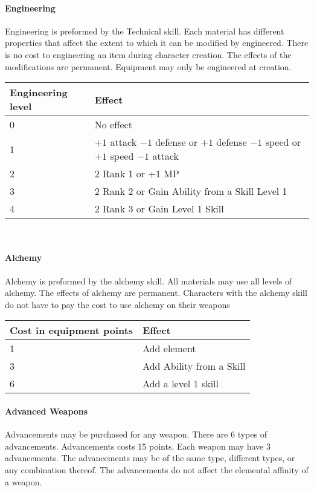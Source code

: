 \paragraph{Engineering}

Engineering is preformed by the Technical skill.  Each material has different
properties that affect the extent to which it can be modified by engineered.
There is no cost to engineering an item during character creation.  The effects
of the modifications are permanent.  Equipment may only be engineered at
creation. \\
\begin{center}
\begin{tabularx}{\textwidth}{X X}
\hline
Engineering level & Effect \\

\hline0 & No effect \\
1 & $+1$ attack $-1$ defense or $+1$ defense $-1$ speed or $+1$ speed $-1$ attack \\
2 & 2 Rank 1 or +1 MP \\
3 & 2 Rank 2 or Gain Ability from a Skill Level 1\\
4 & 2 Rank 3 or Gain Level 1 Skill \\
\hline
\end{tabularx}\\
\end{center}

\paragraph{Alchemy}
Alchemy is preformed by the alchemy skill.  All materials may use all levels of
alchemy.  The effects of alchemy are permanent.  Characters with the alchemy
skill do not have to pay the cost to use alchemy on their weapons
\begin{center}
\begin{tabularx}{\textwidth}{X X}
\hline 
Cost in equipment points &Effect\\
\hline 1 & Add element\\
3 & Add Ability from a Skill\\
6 & Add a level 1 skill \\
\hline
\end{tabularx}
\end{center}

\paragraph{Advanced Weapons}
Advancements may be purchased for any weapon.  There are 6 types of
advancements.  Advancements costs 15 points.  Each weapon may have 3
advancements.  The advancements may be of the same type, different types, or any
combination thereof.  The advancements do not affect the elemental affinity of
a weapon.

